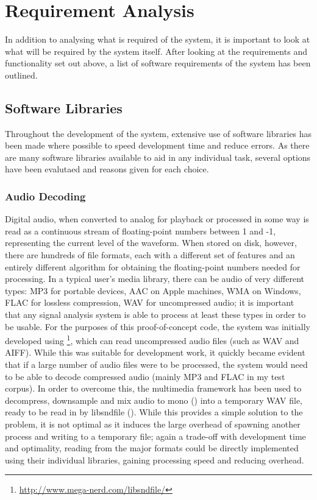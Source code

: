 \section{Requirement Analysis}
In addition to analysing what is required of the system, it is important to look at what will be required by the system itself. After looking at the requirements and functionality set out above, a list of software requirements of the system has been outlined.
\subsection{Software Libraries}
Throughout the development of the system, extensive use of software libraries has been made where possible to speed development time and reduce errors. As there are many software libraries available to aid in any individual task, several options have been evalutaed and reasons given for each choice.
\subsubsection{Audio Decoding}
Digital audio, when converted to analog for playback or processed in some way is read as a continuous stream of floating-point numbers between 1 and -1, representing the current level of the waveform. When stored on disk, however, there are hundreds of file formats, each with a different set of features and an entirely different algorithm for obtaining the floating-point numbers needed for processing. In a typical user's media library, there can be audio of very different types: MP3 for portable devices, AAC on Apple machines, WMA on Windows, FLAC for lossless compression, WAV for uncompressed audio; it is important that any signal analysis system is able to process at least these types in order to be usable. For the purposes of this proof-of-concept code, the system was initially developed using \footnote{\url{http://www.mega-nerd.com/libsndfile/}}, which can read uncompressed audio files (such as WAV and AIFF). While this was suitable for development work, it quickly became evident that if a large number of audio files were to be processed, the system would need to be able to decode compressed audio (mainly MP3 and FLAC in my test corpus). In order to overcome this, the  multimedia framework has been used to decompress, downsample and mix audio to mono () into a temporary WAV file, ready to be read in by libsndfile (). While this provides a simple solution to the problem, it is not optimal as it induces the large overhead of spawning another process and writing to a temporary file; again a trade-off with development time and optimality, reading from the major formats could be directly implemented using their individual libraries, gaining processing speed and reducing overhead.
